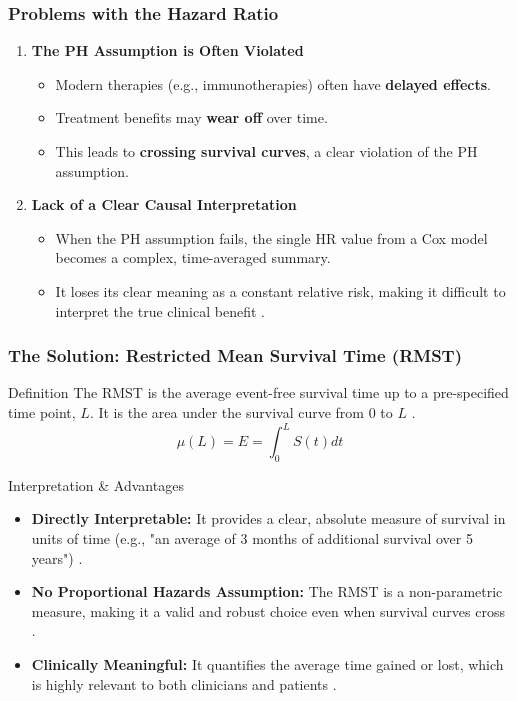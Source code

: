 \documentclass{beamer}
\begin{document}
\begin{frame}
\frametitle{Problems with the Hazard Ratio}
\begin{enumerate}
    \item \textbf{The PH Assumption is Often Violated} \cite{[1]}
    \begin{itemize}
        \item Modern therapies (e.g., immunotherapies) often have \textbf{delayed effects}.
        \item Treatment benefits may \textbf{wear off} over time.
        \item This leads to \textbf{crossing survival curves}, a clear violation of the PH assumption.
    \end{itemize}
    \vspace{1em}
    \item \textbf{Lack of a Clear Causal Interpretation}
    \begin{itemize}
        \item When the PH assumption fails, the single HR value from a Cox model becomes a complex, time-averaged summary.
        \item It loses its clear meaning as a constant relative risk, making it difficult to interpret the true clinical benefit \cite{[1]}.
    \end{itemize}
\end{enumerate}
\end{frame}

\begin{frame}
\frametitle{The Solution: Restricted Mean Survival Time (RMST)}
\begin{block}{Definition}
The RMST is the average event-free survival time up to a pre-specified time point, $L$. It is the area under the survival curve from 0 to $L$ \cite{[1]}.
$$\mu(L) = E = \int_0^L S(t) dt$$
\end{block}

\begin{block}{Interpretation \& Advantages}
\begin{itemize}
    \item \textbf{Directly Interpretable:} It provides a clear, absolute measure of survival in units of time (e.g., "an average of 3 months of additional survival over 5 years") \cite{[1, 1]}.
    \item \textbf{No Proportional Hazards Assumption:} The RMST is a non-parametric measure, making it a valid and robust choice even when survival curves cross \cite{[1]}.
    \item \textbf{Clinically Meaningful:} It quantifies the average time gained or lost, which is highly relevant to both clinicians and patients \cite{[1]}.
\end{itemize}
\end{block}
\end{frame}
\end{document}
